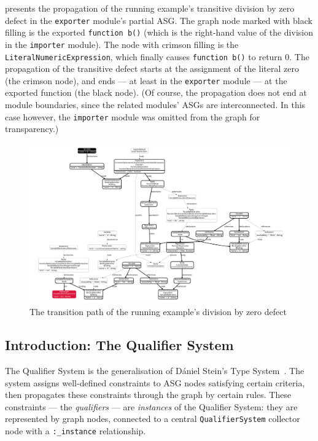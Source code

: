  presents the propagation of the running example's transitive division by zero defect in the \lstinline{exporter} module's partial ASG. The graph node marked with black filling is the exported \lstinline{function b()} (which is the right-hand value of the division in the \lstinline{importer} module). The node with crimson filling is the \lstinline{LiteralNumericExpression}, which finally causes \lstinline{function b()} to return 0. The propagation of the transitive defect starts at the assignment of the literal zero (the crimson node), and ends — at least in the \lstinline{exporter} module — at the exported function (the black node). (Of course, the propagation does not end at module boundaries, since the related modules' ASGs are interconnected. In this case however, the \lstinline{importer} module was omitted from the graph for transparency.)

\begin{figure}
  \centering
	\includegraphics[width=\textwidth, trim=12mm 12mm 12mm 12mm,clip]{figures/transitive-defect-propagation.pdf}
  \caption{The transition path of the running example's division by zero defect}
  \label{fig:transitive-defect-propagation}
\end{figure}


\subsection{Introduction: The Qualifier System}

The Qualifier System is the generalisation of Dániel Stein's Type System~\cite{stein-daniel-msc}. The system assigns well-defined constraints to ASG nodes satisfying certain criteria, then propagates these constraints through the graph by certain rules. These constraints — the \emph{qualifiers} — are \emph{instances} of the Qualifier System: they are represented by graph nodes, connected to a central \lstinline{QualifierSystem} collector node with a \lstinline{:_instance} relationship.

